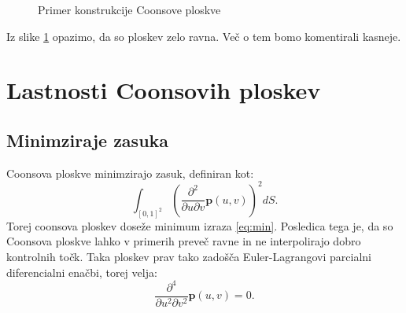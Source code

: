 \documentclass[a4paper,12pt]{article}
\begin{document}
\begin{figure}[ht!]
   \centering
   
   \caption{Primer konstrukcije Coonsove ploskve}
\label{fig:whatever}
\end{figure}
Iz slike \ref{fig:whatever} opazimo, da so ploskev zelo ravna. Več o tem bomo komentirali kasneje.

\section{Lastnosti Coonsovih ploskev}

\subsection{Minimziraje zasuka}
Coonsova ploskve minimzirajo zasuk, definiran kot:
\begin{equation}
   \label{eq:min}
   \int_{[0,1]^2} \left( \frac{\partial^2}{\partial u \partial v}\mathbf{p}(u,v) \right)^2 dS.
\end{equation}
Torej coonsova ploskev doseže minimum izraza \eqref{eq:min}.
Posledica tega je, da so Coonsova ploskve lahko v primerih preveč ravne in ne interpolirajo dobro kontrolnih točk.
Taka ploskev prav tako zadošča Euler-Lagrangovi parcialni diferencialni enačbi, torej velja:
\begin{equation}
   \label{eq:pde}
    \frac{\partial^4}{\partial u^2 \partial v^2}\mathbf{p}(u,v) = 0.
\end{equation}
\end{document}
